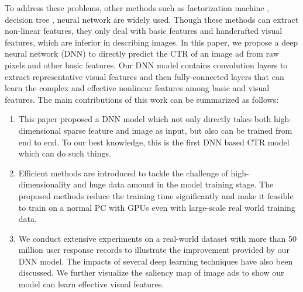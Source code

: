 \documentclass{sig-alternate}
\begin{document}
To address these problems, other methods such as factorization machine \cite{rendle2010factorization}, decision tree \cite{he2014practical}, neural network \cite{zhang2016deep} are widely used. Though these methods can extract non-linear features, they only deal with basic features and handcrafted visual features, which are inferior in describing images. In this paper, we propose a deep neural network (DNN) to directly predict the CTR of an image ad from raw pixels and other basic features. Our DNN model contains convolution layers to extract representative visual features and then fully-connected layers that can learn the complex and effective nonlinear features among basic and visual features. The main contributions of this work can be summarized as follows:
\begin{enumerate}
	\item This paper proposed a DNN model which not only directly takes both high-dimensional sparse feature and image as input, but also can be trained from end to end. To our best knowledge, this is the first DNN based CTR model which can do such things.
	\item Efficient methods are introduced to tackle the challenge of  high-dimensionality and huge data amount in the model training stage. The proposed methods reduce the training time significantly and make it feasible to train on a normal PC with GPUs even with large-scale real world training data.
	\item We conduct extensive experiments on a real-world dataset with more than 50 million user response records to illustrate the improvement provided by our DNN model.  The impacts of several deep learning techniques have also been discussed.  We further visualize the saliency map of image ads to show our model can learn effective visual features.
\end{enumerate}
\end{document}
